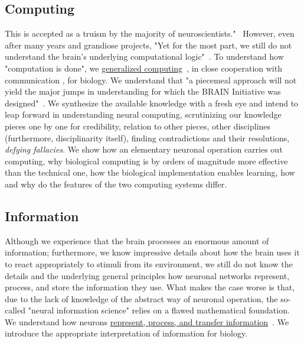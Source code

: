 \subsection*{Computing\label{sec:StateComputing}}
This is accepted as a truism by the majority of neuroscientists."~\cite{ KochBiophysics:1999} However, even after many years and grandiose projects, 
"Yet for the most part, we still do not understand the brain’s underlying computational logic"~\cite{BrainInitiative10:2024}.
To understand how "computation is done", we 
\hyperlink{GeneralizedComputing}
{generalized computing}~\cite{VeghRevisingClassicComputing:2021},
in close cooperation with 
{communication}
\cite{RoleOfInformationTransferSpeed:2022}, for biology.
We understand that "a piecemeal approach will not yield the major jumps in understanding for which the BRAIN Initiative was designed"~\cite{NIHBrainStrategy:2020}.
We synthesize the available knowledge with a fresh eye and intend to leap forward in understanding neural computing,
scrutinizing our knowledge
pieces one by one for credibility, relation to other pieces, other disciplines (furthermore, disciplinarity itself),
finding contradictions and their resolutions,  \textit{defying fallacies}.
We show how an elementary neuronal operation carries out computing, why biological 
computing is by orders of magnitude more effective than the technical one,
how the biological implementation enables learning,
how and why do the features of the two computing systems differ.

\subsection*{Information\label{sec:StateInformation}}
Although we experience that the brain processes an enormous amount of information; furthermore, we know impressive details about how the brain uses it
to react appropriately to stimuli from its environment,
we still do not know the details and the underlying general principles
how neuronal networks represent, process, and store the information they use.
What makes the case worse is that, due to the lack of knowledge of the abstract way of neuronal operation,
the so-called "neural information science" relies on a flawed mathematical foundation.
We understand how neurons 
\hyperlink{information-biology}
{represent, process, and transfer information}~\cite{VeghNeuralShannon:2022,VeghChannelCapacity:2023}.
We introduce the appropriate interpretation of
{information for biology}.   


